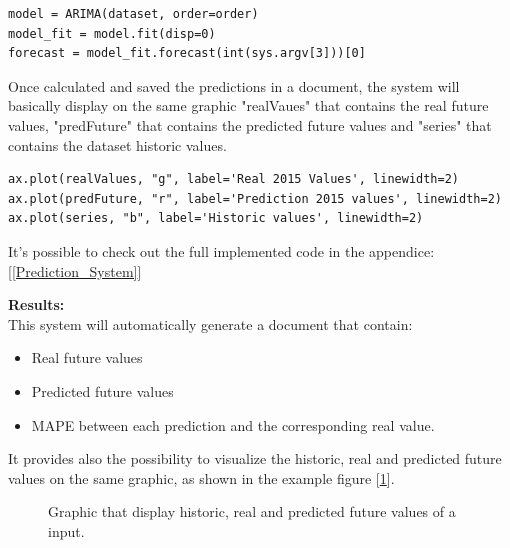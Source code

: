 \begin{lstlisting}
model = ARIMA(dataset, order=order)
model_fit = model.fit(disp=0)
forecast = model_fit.forecast(int(sys.argv[3]))[0]
\end{lstlisting}

Once calculated and saved the predictions in a document, the system will basically display on the same graphic "realVaues" that contains the real future values, "predFuture" that contains the predicted future values and "series" that contains the dataset historic values.
\begin{lstlisting}
ax.plot(realValues, "g", label='Real 2015 Values', linewidth=2)
ax.plot(predFuture, "r", label='Prediction 2015 values', linewidth=2)
ax.plot(series, "b", label='Historic values', linewidth=2)
\end{lstlisting}

It's possible to check out the full implemented code in the appendice: [\ref{Prediction_System}]

\newpage

\textbf{Results:}\\
This system will automatically generate a document that contain:
\vspace{-5mm}
\begin{itemize}
 \setlength{\itemsep}{-5pt} 
\item Real future values
\item Predicted future values
\item MAPE between each prediction and the corresponding real value.
\end{itemize}

It provides also the possibility to visualize the historic, real and predicted future values on the same graphic, as shown in the example figure [\ref{GraphicForecasting}].

\begin{figure}[H]
    \caption{Graphic that display historic, real and predicted future values of a input.}
\label{GraphicForecasting}
\end{figure}


\newpage



